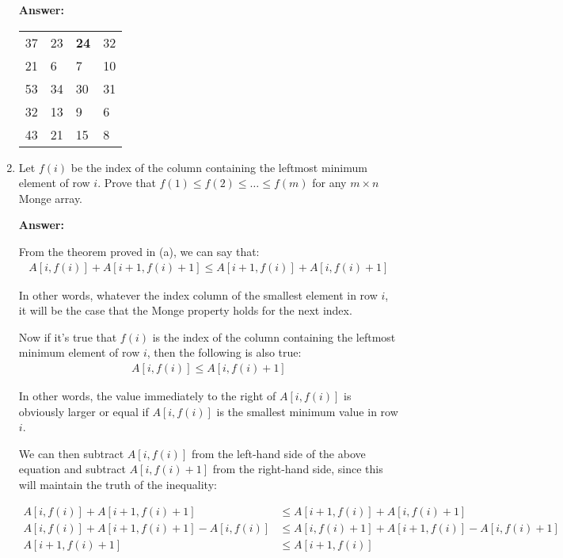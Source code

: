 \documentclass[]{book}
\theoremstyle{definition}
\begin{document}
\begin{enumerate}[label=\alph*.]
    \textbf{Answer:} 

        \begin{table}[H]
        \centering
        \captionsetup{labelfont=it,justification=centering} 		%
        \begin{tabular}{l l l l} %
            37 & 23 & \textbf{24} & 32   \tabularnewline
            21 & 6 & 7 & 10     \tabularnewline
            53 & 34 & 30 & 31   \tabularnewline
            32 & 13 & 9 & 6     \tabularnewline
            43 & 21 & 15 & 8    \tabularnewline
        \end{tabular}
        \end{table}

    \item Let $f(i)$ be the index of the column containing the leftmost minimum element of row $i$.
          Prove that $f(1) \leq f(2) \leq \dots \leq f(m)$ for any $m \times n$ Monge array.

    \textbf{Answer:} 

    From the theorem proved in (a), we can say that:
    \begin{align*}
        A[i, f(i)] + A[i+1, f(i)+1] \leq A[i+1, f(i)] + A[i, f(i)+1]
    \end{align*}

    In other words, whatever the index column of the smallest element in row $i$, it will
    be the case that the Monge property holds for the next index.

    Now if it's true that $f(i)$ is the index of the column containing the leftmost minimum element of row $i$,
    then the following is also true:
    \begin{align*}
        A[i, f(i)] \leq A[i, f(i)+1]
    \end{align*}
    
    In other words, the value immediately to the right of $A[i, f(i)]$
    is obviously larger or equal if $A[i, f(i)]$ is the smallest minimum value in row $i$.
    
    We can then subtract $A[i, f(i)]$ from the left-hand side of the above equation and subtract
    $A[i, f(i)+1]$ from the right-hand side, since this will maintain the truth of the inequality:

    \begin{align*}
        A[i, f(i)] + A[i+1, f(i)+1] &\leq A[i+1, f(i)] + A[i, f(i)+1] \\
        A[i, f(i)] + A[i+1, f(i)+1] - A[i, f(i)] &\leq A[i, f(i)+1] + A[i+1, f(i)] - A[i, f(i)+1] \\
        A[i+1, f(i)+1] &\leq A[i+1, f(i)]
    \end{align*}


\end{enumerate}
\end{document}

